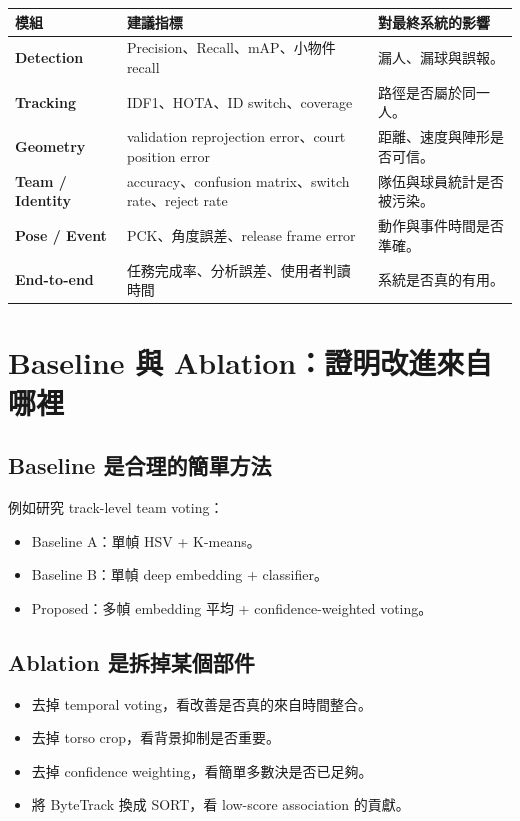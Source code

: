 \documentclass[11pt,a4paper,oneside]{report}
\begin{document}
\begin{tabularx}{\textwidth}{>{\bfseries}p{3cm} Y Y}
\toprule
模組 & 建議指標 & 對最終系統的影響 \\
\midrule
Detection & Precision、Recall、mAP、小物件 recall & 漏人、漏球與誤報。\\
Tracking & IDF1、HOTA、ID switch、coverage & 路徑是否屬於同一人。\\
Geometry & validation reprojection error、court position error & 距離、速度與陣形是否可信。\\
Team / Identity & accuracy、confusion matrix、switch rate、reject rate & 隊伍與球員統計是否被污染。\\
Pose / Event & PCK、角度誤差、release frame error & 動作與事件時間是否準確。\\
End-to-end & 任務完成率、分析誤差、使用者判讀時間 & 系統是否真的有用。\\
\bottomrule
\end{tabularx}

\section{Baseline 與 Ablation：證明改進來自哪裡}

\subsection{Baseline 是合理的簡單方法}

例如研究 track-level team voting：

\begin{itemize}
  \item Baseline A：單幀 HSV + K-means。
  \item Baseline B：單幀 deep embedding + classifier。
  \item Proposed：多幀 embedding 平均 + confidence-weighted voting。
\end{itemize}

\subsection{Ablation 是拆掉某個部件}

\begin{itemize}
  \item 去掉 temporal voting，看改善是否真的來自時間整合。
  \item 去掉 torso crop，看背景抑制是否重要。
  \item 去掉 confidence weighting，看簡單多數決是否已足夠。
  \item 將 ByteTrack 換成 SORT，看 low-score association 的貢獻。
\end{itemize}
\end{document}
